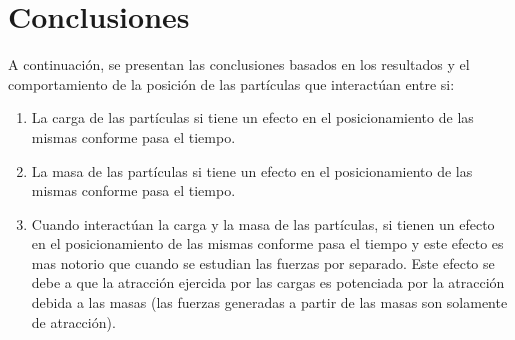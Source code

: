 \documentclass{article}
\begin{document}
	\section{Conclusiones}
	A continuación, se presentan las conclusiones basados en los resultados y el comportamiento de la posición de las partículas que interactúan entre si:
	\begin{enumerate}
		\item La carga de las partículas si tiene un efecto en el posicionamiento de las mismas conforme pasa el tiempo. 
		\item	La masa de las partículas si tiene un efecto en el posicionamiento de las mismas conforme pasa el tiempo. 
		\item Cuando interactúan la carga y la masa de las partículas, si tienen un efecto en el posicionamiento de las mismas conforme pasa el tiempo y este efecto es mas notorio que cuando se estudian las fuerzas por separado. Este efecto se debe a que la atracción ejercida por las cargas es potenciada por la atracción debida a las masas (las fuerzas generadas a partir de las masas son solamente de atracción).
		
	\end{enumerate}



	
\end{document}
